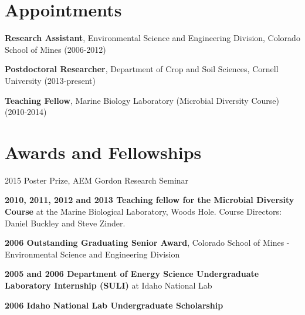 \documentclass[letterpaper]{article}
\renewenvironment{itemize}{
  \begin{list}{}{
    \setlength{\leftmargin}{1.5em}
  }
}{
  \end{list}
}
\begin{document}

\section*{Appointments}
\begin{itemize}
    \item \textbf{Research Assistant}, Environmental Science and Engineering
        Division, Colorado School of Mines (2006-2012)
    \item \textbf{Postdoctoral Researcher}, Department of Crop and Soil
        Sciences, Cornell University (2013-present)
    \item \textbf{Teaching Fellow}, Marine Biology Laboratory (Microbial
        Diversity Course) (2010-2014)
\end{itemize}
\section*{Awards and Fellowships}
\begin{itemize}
    \item 2015 Poster Prize, AEM Gordon Research Seminar
    \item \textbf{2010, 2011, 2012 and 2013 Teaching fellow for the Microbial
        Diversity Course} at the Marine Biological Laboratory, Woods
        Hole.  Course Directors: Daniel Buckley and Steve Zinder.
    \item \textbf{2006 Outstanding Graduating Senior Award}, Colorado School of Mines - Environmental Science and Engineering Division
    \item \textbf{2005 and 2006 Department of Energy Science Undergraduate Laboratory Internship
        (SULI)} at Idaho National Lab
    \item \textbf{2006 Idaho National Lab Undergraduate Scholarship}
\end{itemize}
\end{document}
